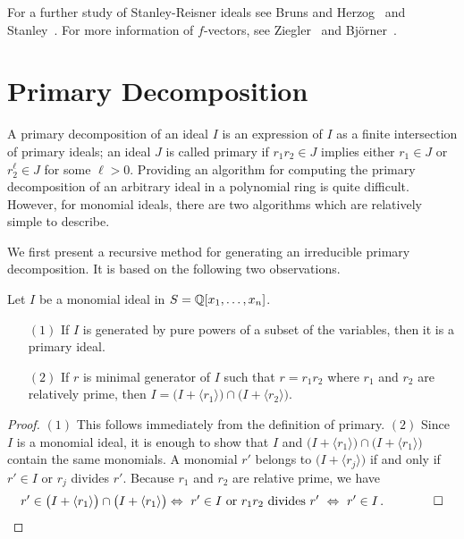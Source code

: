 For a further study of Stanley-Reisner ideals see Bruns and
Herzog~\cite{MR95h:13020} and Stanley~\cite{MR98h:05001}.  For more
information of $f$-vectors, see Ziegler~\cite{MR96a:52011} and
Bj\"{o}rner~\cite{MR96h:05213}.

\section{Primary Decomposition}

A primary decomposition of an ideal $I$
is an expression of $I$ as a finite intersection of primary ideals; an
ideal $J$ is called primary if $r_{1}r_{2} \in J$
implies either $r_{1} \in J$ or $r_{2}^{\ell} \in J$ for some $\ell >
0$.  Providing an algorithm for computing the primary decomposition of
an arbitrary ideal in a polynomial ring is quite difficult.  However,
for monomial ideals, there are two algorithms which are relatively
simple to describe.

We first present a recursive method for generating an irreducible
primary decomposition.  It is based on the following two observations.
\begin{lemma}
Let $I$ be a monomial ideal in $S = {\mathbb Q}[x_1, \dotsc, x_n]$.
\begin{enumerate}
\item[$(1)$] If $I$ is generated by pure powers of a subset of the
variables, then it is a primary ideal.
\item[$(2)$] If $r$ is minimal generator of $I$ such that $r =
r_{1}r_{2}$ where $r_{1}$ and $r_{2}$ are relatively prime, then $I =
\big(I + \langle r_{1} \rangle \big) \cap \big(I + \langle r_{2}
\rangle \big)$.
\end{enumerate}
\end{lemma}

\begin{proof}
$(1)$ This follows immediately from the definition of primary.  $(2)$
Since $I$ is a monomial ideal, it is enough to show that $I$ and
$\big( I + \langle r_{1} \rangle \big) \cap \big( I + \langle r_{1}
\rangle \big)$ contain the same monomials.  A monomial $r'$ belongs to
$\big( I + \langle r_{j} \rangle \big)$ if and only if $r' \in I$ or
$r_{j}$ divides $r'$.  Because $r_{1}$ and $r_{2}$ are relative prime,
we have
\[
r' \in \big( I + \langle r_{1} \rangle \big) \cap \big( I + \langle
r_{1} \rangle \big) \Leftrightarrow \text{ $r' \in I$ or $r_{1}r_{2}$
divides $r'$ } \Leftrightarrow \text{ $r' \in I$} \, . \qquad \qed
\]
\end{proof}


